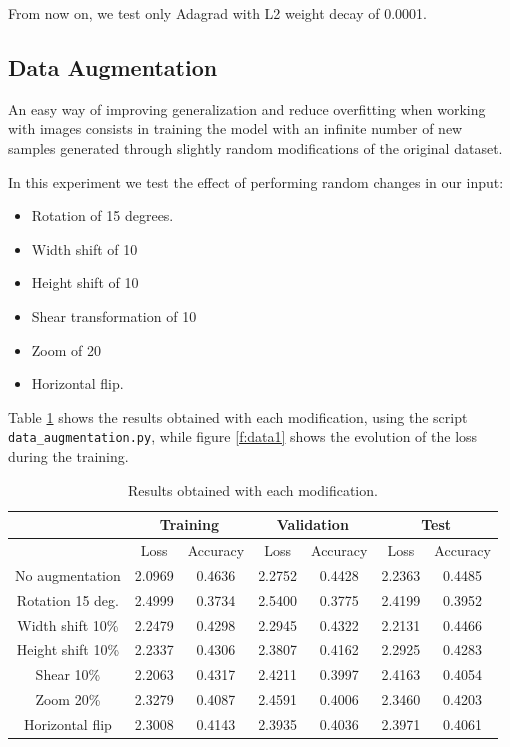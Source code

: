 \documentclass[]{article}
\begin{document}
From now on, we test only Adagrad with L2 weight decay of 0.0001.

\subsection{Data Augmentation}

An easy way of improving generalization and reduce overfitting when working with images consists in training the model with an infinite number of new samples generated through slightly random modifications of the original dataset.

In this experiment we test the effect of performing random changes in our input:

\begin{itemize}
	\item Rotation of 15 degrees.
	\item Width shift of 10%
	\item Height shift of 10%
	\item Shear transformation of 10%
	\item Zoom of 20%
	\item Horizontal flip.
\end{itemize}

Table \ref{t:data1} shows the results obtained with each modification, using the script \texttt{data\_augmentation.py}, while figure \ref{f:data1} shows the evolution of the loss during the training.

\begin{table}[H]
	\centering
	\label{t:data1}
	\begin{tabular}{@{}ccccccc@{}}
		\toprule
		& \multicolumn{2}{c}{Training} & \multicolumn{2}{c}{Validation} & \multicolumn{2}{c}{Test} \\ \midrule
		& Loss         & Accuracy      & Loss          & Accuracy       & Loss       & Accuracy    \\
		\midrule
		No augmentation   & 2.0969       & 0.4636        & 2.2752        & 0.4428         & 2.2363     & 0.4485      \\
		Rotation 15 deg.  & 2.4999       & 0.3734        & 2.5400        & 0.3775         & 2.4199     & 0.3952      \\
		Width shift 10\%  & 2.2479       & 0.4298        & 2.2945        & 0.4322         & 2.2131     & 0.4466      \\
		Height shift 10\% & 2.2337       & 0.4306        & 2.3807        & 0.4162         & 2.2925     & 0.4283      \\
		Shear 10\%        & 2.2063       & 0.4317        & 2.4211        & 0.3997         & 2.4163     & 0.4054      \\
		Zoom 20\%         & 2.3279       & 0.4087        & 2.4591        & 0.4006         & 2.3460     & 0.4203      \\
		Horizontal flip   & 2.3008       & 0.4143        & 2.3935        & 0.4036         & 2.3971     & 0.4061      \\ \bottomrule
	\end{tabular}
	\caption{Results obtained with each modification.}
\end{table}
\end{document}
